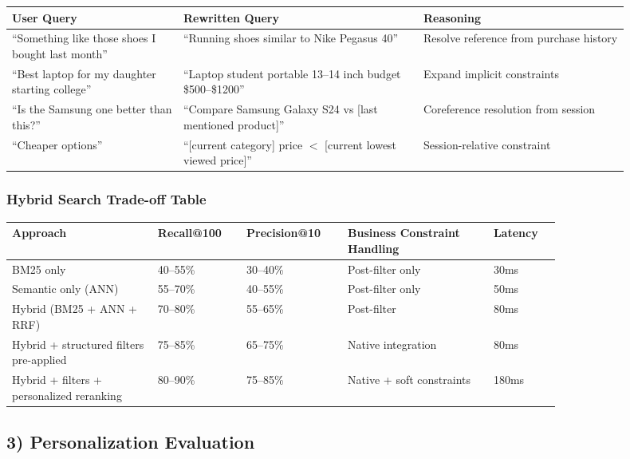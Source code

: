 \begin{tabular}{|p{0.25\linewidth}|p{0.35\linewidth}|p{0.30\linewidth}|}
\hline
\textbf{User Query} & \textbf{Rewritten Query} & \textbf{Reasoning} \\
\hline
``Something like those shoes I bought last month'' & ``Running shoes similar to Nike Pegasus 40'' & Resolve reference from purchase history \\
\hline
``Best laptop for my daughter starting college'' & ``Laptop student portable 13--14 inch budget \$500--\$1200'' & Expand implicit constraints \\
\hline
``Is the Samsung one better than this?'' & ``Compare Samsung Galaxy S24 vs [last mentioned product]'' & Coreference resolution from session \\
\hline
``Cheaper options'' & ``[current category] price $<$ [current lowest viewed price]'' & Session-relative constraint \\
\hline
\end{tabular}

\subsubsection*{Hybrid Search Trade-off Table}

\begin{tabular}{|p{0.22\linewidth}|p{0.12\linewidth}|p{0.14\linewidth}|p{0.22\linewidth}|p{0.10\linewidth}|}
\hline
\textbf{Approach} & \textbf{Recall@100} & \textbf{Precision@10} & \textbf{Business Constraint Handling} & \textbf{Latency} \\
\hline
BM25 only & 40--55\% & 30--40\% & Post-filter only & 30ms \\
\hline
Semantic only (ANN) & 55--70\% & 40--55\% & Post-filter only & 50ms \\
\hline
Hybrid (BM25 + ANN + RRF) & 70--80\% & 55--65\% & Post-filter & 80ms \\
\hline
Hybrid + structured filters pre-applied & 75--85\% & 65--75\% & Native integration & 80ms \\
\hline
Hybrid + filters + personalized reranking & 80--90\% & 75--85\% & Native + soft constraints & 180ms \\
\hline
\end{tabular}

\subsection*{3) Personalization Evaluation}


